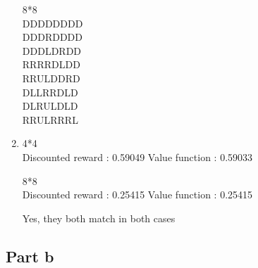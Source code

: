 \documentclass{article}
\begin{document}
\begin{enumerate}[label=(\alph*)]
8*8\\
DDDDDDDD\\
DDDRDDDD\\
DDDLDRDD\\
RRRRDLDD\\
RRULDDRD\\
DLLRRDLD\\
DLRULDLD\\
RRULRRRL\\

\item 

4*4 \\
Discounted reward : 0.59049
Value function : 0.59033

8*8 \\
Discounted reward : 0.25415
Value function : 0.25415

Yes, they both match in both cases
\end{enumerate}


\subsection{Part b}
\end{document}
